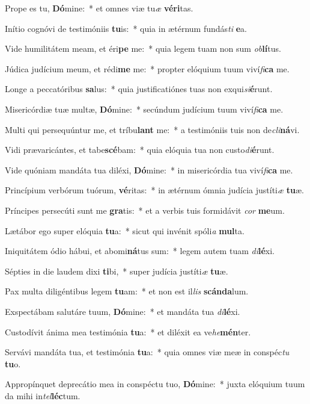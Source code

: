 \item Prope es tu, \textbf{Dó}mine:~* et omnes viæ tu\textit{æ} \textbf{vé}\textbf{ri}tas.
\item Inítio cognóvi de testimóniis \textbf{tu}is:~* quia in ætérnum fundás\textit{ti} \textbf{e}a.
\item Vide humilitátem meam, et éri\textbf{pe} me:~* quia legem tuam non sum \textit{ob}\textbf{lí}tus.
\item Júdica judícium meum, et rédi\textbf{me} me:~* propter elóquium tuum viví\textit{fi}\textbf{ca} me.
\item Longe a peccatóribus \textbf{sa}lus:~* quia justificatiónes tuas non exqui\textit{si}\textbf{é}runt.
\item Misericórdiæ tuæ multæ, \textbf{Dó}mine:~* secúndum judícium tuum viví\textit{fi}\textbf{ca} me.
\item Multi qui persequúntur me, et tríbu\textbf{lant} me:~* a testimóniis tuis non de\textit{cli}\textbf{ná}vi.
\item Vidi prævaricántes, et tabe\textbf{scé}bam:~* quia elóquia tua non custo\textit{di}\textbf{é}runt.
\item Vide quóniam mandáta tua diléxi, \textbf{Dó}mine:~* in misericórdia tua viví\textit{fi}\textbf{ca} me.
\item Princípium verbórum tuórum, \textbf{vé}ritas:~* in ætérnum ómnia judícia justíti\textit{æ} \textbf{tu}æ.
\item Príncipes persecúti sunt me \textbf{gra}tis:~* et a verbis tuis formidávit \textit{cor} \textbf{me}um.
\item Lætábor ego super elóquia \textbf{tu}a:~* sicut qui invénit spóli\textit{a} \textbf{mul}ta.
\item Iniquitátem ódio hábui, et abomi\textbf{ná}tus sum:~* legem autem tuam \textit{di}\textbf{lé}xi.
\item Sépties in die laudem dixi \textbf{ti}bi,~* super judícia justíti\textit{æ} \textbf{tu}æ.
\item Pax multa diligéntibus legem \textbf{tu}am:~* et non est il\textit{lis} \textbf{scán}\textbf{da}lum.
\item Exspectábam salutáre tuum, \textbf{Dó}mine:~* et mandáta tua \textit{di}\textbf{lé}xi.
\item Custodívit ánima mea testimónia \textbf{tu}a:~* et diléxit ea ve\textit{he}\textbf{mén}ter.
\item Servávi mandáta tua, et testimónia \textbf{tu}a:~* quia omnes viæ meæ in conspéc\textit{tu} \textbf{tu}o.
\item Appropínquet deprecátio mea in conspéctu tuo, \textbf{Dó}mine:~* juxta elóquium tuum da mihi in\textit{tel}\textbf{léc}tum.
